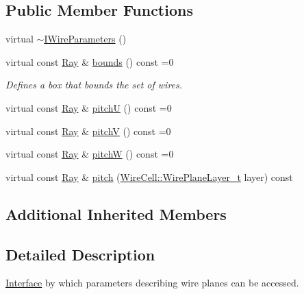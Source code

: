 \subsection*{Public Member Functions}
\begin{DoxyCompactItemize}
\item 
virtual \hyperlink{class_wire_cell_1_1_i_wire_parameters_a72110335b0bd52beceff2c34b64778d5}{$\sim$\+I\+Wire\+Parameters} ()
\item 
virtual const \hyperlink{namespace_wire_cell_a3ab20d9b438feb7eb1ffaab9ba98af0c}{Ray} \& \hyperlink{class_wire_cell_1_1_i_wire_parameters_a4cc116cbfff382ec8ba7711df078f845}{bounds} () const =0
\begin{DoxyCompactList}\small\item\em Defines a box that bounds the set of wires. \end{DoxyCompactList}\item 
virtual const \hyperlink{namespace_wire_cell_a3ab20d9b438feb7eb1ffaab9ba98af0c}{Ray} \& \hyperlink{class_wire_cell_1_1_i_wire_parameters_a37e3bb80331664feb75d00eb957fda78}{pitchU} () const =0
\item 
virtual const \hyperlink{namespace_wire_cell_a3ab20d9b438feb7eb1ffaab9ba98af0c}{Ray} \& \hyperlink{class_wire_cell_1_1_i_wire_parameters_a696c827d971a57805da41e3f2f14ba35}{pitchV} () const =0
\item 
virtual const \hyperlink{namespace_wire_cell_a3ab20d9b438feb7eb1ffaab9ba98af0c}{Ray} \& \hyperlink{class_wire_cell_1_1_i_wire_parameters_a4e9d46ba775e642112628b79853b58cb}{pitchW} () const =0
\item 
virtual const \hyperlink{namespace_wire_cell_a3ab20d9b438feb7eb1ffaab9ba98af0c}{Ray} \& \hyperlink{class_wire_cell_1_1_i_wire_parameters_aafb960715541113e82448f74e0f34e46}{pitch} (\hyperlink{namespace_wire_cell_a761397ff086f0a7e1a1d9ccd251ac618}{Wire\+Cell\+::\+Wire\+Plane\+Layer\+\_\+t} layer) const
\end{DoxyCompactItemize}
\subsection*{Additional Inherited Members}


\subsection{Detailed Description}
\hyperlink{class_wire_cell_1_1_interface}{Interface} by which parameters describing wire planes can be accessed.

